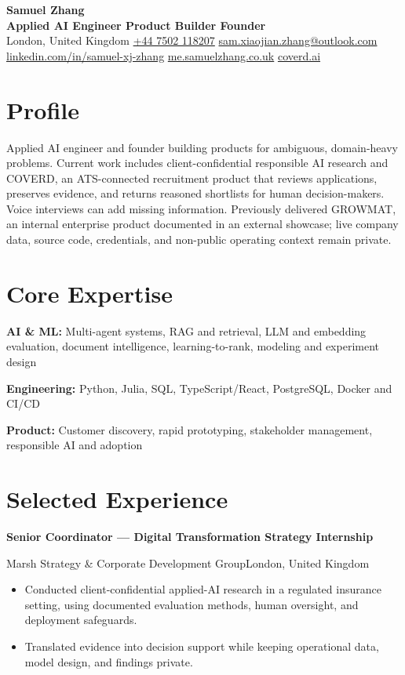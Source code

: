 \documentclass[11pt,a4paper]{extarticle}
\newcommand{\cvdate}[1]{{\normalfont\normalsize\bfseries #1}}
\newcommand{\primaryrole}[4]{%
  \textbf{#1}\par\vspace{-1pt}
  {\small\color{muted}#2\enspace\textbullet\enspace #4\hfill\color{ink}\cvdate{#3}\par}\vspace{-1pt}
}
\begin{document}
\begin{center}
  {\huge\bfseries Samuel Zhang}\\[2pt]
  {\large\bfseries Applied AI Engineer \textperiodcentered{} Product Builder \textperiodcentered{} Founder}\\[4pt]
  \small
  London, United Kingdom \enspace\textbullet\enspace
  \href{tel:+447502118207}{+44 7502 118207} \enspace\textbullet\enspace
  \href{mailto:sam.xiaojian.zhang@outlook.com}{sam.xiaojian.zhang@outlook.com}\\[-1pt]
  \href{https://www.linkedin.com/in/samuel-xj-zhang/}{linkedin.com/in/samuel-xj-zhang}
  \enspace\textbullet\enspace
  \href{https://me.samuelzhang.co.uk}{me.samuelzhang.co.uk}
  \enspace\textbullet\enspace
  \href{https://coverd.ai}{coverd.ai}
\end{center}

\section{Profile}
Applied AI engineer and founder building products for ambiguous, domain-heavy problems. Current work includes client-confidential responsible AI research and COVERD, an ATS-connected recruitment product that reviews applications, preserves evidence, and returns reasoned shortlists for human decision-makers. Voice interviews can add missing information. Previously delivered GROWMAT, an internal enterprise product documented in an external showcase; live company data, source code, credentials, and non-public operating context remain private.

\section{Core Expertise}
\textbf{AI \& ML:} Multi-agent systems, RAG and retrieval, LLM and embedding evaluation, document intelligence, learning-to-rank, modeling and experiment design

\textbf{Engineering:} Python, Julia, SQL, TypeScript/React, PostgreSQL, Docker and CI/CD

\textbf{Product:} Customer discovery, rapid prototyping, stakeholder management, responsible AI and adoption


\section{Selected Experience}

\primaryrole{Senior Coordinator --- Digital Transformation Strategy Internship}{Marsh \textperiodcentered{} Strategy \& Corporate Development Group}{May 2026 -- Present}{London, United Kingdom}
\begin{itemize}
  \item Conducted client-confidential applied-AI research in a regulated insurance setting, using documented evaluation methods, human oversight, and deployment safeguards.
  \item Translated evidence into decision support while keeping operational data, model design, and findings private.
\end{itemize}
\end{document}
